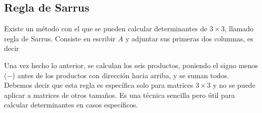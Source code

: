 \newpage

\subsection{Regla de Sarrus}

Existe un método con el que se pueden calcular determinantes de $3 \times 3$, llamado regla de Sarrus. Consiste en escribir $A$ y adjuntar sus primeras dos columnas, es decir
\begin{center}
\end{center}
Una vez hecho lo anterior, se calculan los seis productos, poniendo el signo menos ($-$) antes de los productos con dirección hacia arriba, y se suman todos. Debemos decir que esta regla es específica solo para matrices $3 \times 3$ y no se puede aplicar a matrices de otros tamaños. Es una técnica sencilla pero útil para calcular determinantes en casos específicos.

